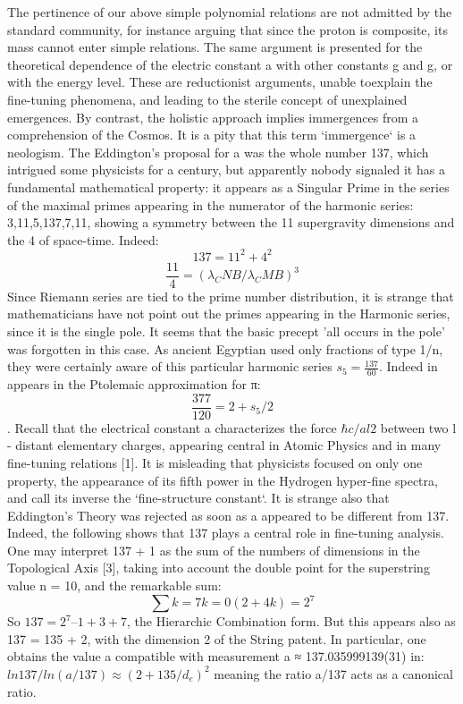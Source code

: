The pertinence of our above simple polynomial relations are not admitted by the standard
community, for instance arguing that since the proton is composite, its mass cannot enter simple
relations. The same argument is presented for the theoretical dependence of the electric constant a
with other constants g and g\prime, or with the energy level. These are reductionist arguments, unable toexplain the fine-tuning phenomena, and leading to the sterile concept of unexplained emergences.
By contrast, the holistic approach implies immergences from a comprehension of the Cosmos. It is a
pity that this term `immergence` is a neologism.
The Eddington's proposal for a was the whole number 137, which intrigued some physicists for a
century, but apparently nobody signaled it has a fundamental mathematical property: it appears as a
Singular Prime in the series of the maximal primes appearing in the numerator of the harmonic
series: 3,11,5,137,7,11, showing a symmetry between the 11 supergravity dimensions and the 4 of
space-time. Indeed:
$$137 = 11^{2} + 4^{2}$$
$$\frac{11}{4} = ( \lambda_CNB /\lambda_CMB )^{3}$$
Since Riemann series are tied to the prime number distribution, it is strange that mathematicians
have not point out the primes appearing in the Harmonic series, since it is the single pole. It seems
that the basic precept 'all occurs in the pole' was forgotten in this case. As ancient Egyptian used
only fractions of type 1/n, they were certainly aware of this particular harmonic series $s_{5} = \frac{137}{60}$.
Indeed in appears in the Ptolemaic approximation for π: $$\frac{377}{120} = 2 + s_{5}/2$$.
Recall that the electrical constant a characterizes the force $\hbar c/al2$ between two l - distant
elementary charges, appearing central in Atomic Physics and in many fine-tuning relations [1]. It is
misleading that physicists focused on only one property, the appearance of its fifth power in the
Hydrogen hyper-fine spectra, and call its inverse the `fine-structure constant`. It is strange also that
Eddington's Theory was rejected as soon as a appeared to be different from 137. Indeed, the
following shows that 137 plays a central role in fine-tuning analysis. One may interpret 137 + 1 as
the sum of the numbers of dimensions in the Topological Axis [3], taking into account the double
point for the superstring value n = 10, and the remarkable sum:
$$\sum{k=7}{k=0}(2 + 4 k ) = 2^{7}$$
So $137 = 2^{7} – 1 + 3 + 7$, the Hierarchic Combination form. But this appears also as 137 = 135 + 2,
with the dimension 2 of the String patent. In particular, one obtains the value a 
compatible with measurement a ≈ 137.035999139(31) in:
$ln137/ln(a/137) \approx (2+135/d_{e})^{2}$
meaning the ratio a/137 acts as a canonical ratio.

